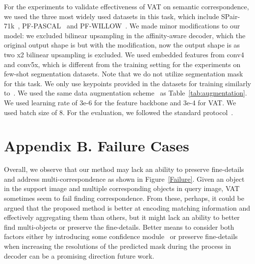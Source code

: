 For the experiments to validate effectiveness of VAT on semantic correspondence, we used the three most widely used datasets in this task, which include SPair-71k~\cite{min2019spair}, PF-PASCAL~\cite{ham2017proposal} and PF-WILLOW~\cite{ham2016proposal}. We made minor modifications to our model: we excluded bilinear upsampling in the affinity-aware decoder, which the original output shape is  but with the modification, now the output shape is  as two x2 bilinear upsampling is excluded. We used embedded features from conv4 and conv5x, which is different from the training setting for the experiments on few-shot segmentation datasets. Note that we do not utilize segmentation mask for this task. We only use keypoints provided in the datasets for training similarly to~\cite{cho2021semantic}. We used the same data augmentation scheme~\cite{cho2021semantic, buslaev2020albumentations} as Table~\ref{tab:augmentation}. We used learning rate of 3e-6 for the feature backbone and 3e-4 for VAT. We used batch size of 8. For the evaluation, we followed the standard protocol~\cite{min2019hyperpixel,min2020learning,liu2020semantic,jeon2020guided,cho2021semantic,min2021convolutional}.
\begin{table}[]
    \centering
    \caption{\textbf{Augmentation type}}
    \label{tab:augmentation}
\end{table}


\section*{Appendix B. Failure Cases}
Overall, we observe that our method may lack an ability to preserve fine-details and address multi-correspondence as shown in Figure~\ref{Failure}. Given an object in the support image and multiple corresponding objects in query image, VAT sometimes seem to fail finding correspondence. From these, perhaps, it could be argued that the proposed method is better at encoding matching information and effectively aggregating them than others, but it might lack an ability to better find multi-objects or preserve the fine-details. Better means to consider both factors either by introducing some confidence module~\cite{truong2021learning} or preserve fine-details when increasing the resolutions of the predicted mask during the process in decoder can be a promising direction future work. 


